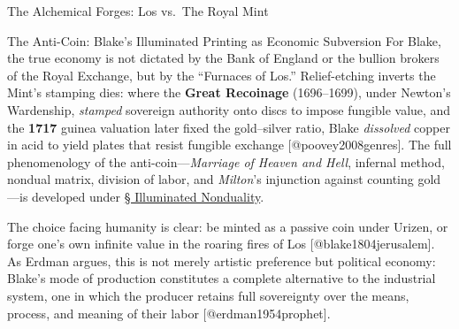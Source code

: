\documentclass[
  ignorenonframetext,
]{beamer}
\begin{document}
\begin{frame}{The Alchemical Forges: Los vs.~The Royal Mint}
\begin{block}{The Anti-Coin: Blake's Illuminated Printing as Economic
Subversion}
\protect{}\label{the-anti-coin-blakes-illuminated-printing-as-economic-subversion}
For Blake, the true economy is not dictated by the Bank of England or
the bullion brokers of the Royal Exchange, but by the ``Furnaces of
Los.'' Relief-etching inverts the Mint's stamping dies: where the
\textbf{Great Recoinage} (1696--1699), under Newton's Wardenship,
\emph{stamped} sovereign authority onto discs to impose fungible value,
and the \textbf{1717} guinea valuation later fixed the gold--silver
ratio, Blake \emph{dissolved} copper in acid to yield plates that resist
fungible exchange {[}@poovey2008genres{]}. The full phenomenology of the
anti-coin---\emph{Marriage of Heaven and Hell}, infernal method, nondual
matrix, division of labor, and \emph{Milton}'s injunction against
counting gold---is developed under
\hyperlink{sec-illuminated-nonduality}{§ Illuminated Nonduality}.

The choice facing humanity is clear: be minted as a passive coin under
Urizen, or forge one's own infinite value in the roaring fires of Los
{[}@blake1804jerusalem{]}. As Erdman argues, this is not merely artistic
preference but political economy: Blake's mode of production constitutes
a complete alternative to the industrial system, one in which the
producer retains full sovereignty over the means, process, and meaning
of their labor {[}@erdman1954prophet{]}.
\end{block}
\end{frame}
\end{document}
